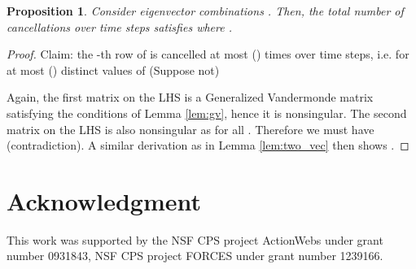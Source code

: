 \documentclass[journal]{IEEEtran}
\newtheorem{prop}{\bf{Proposition}}
\begin{document}
\begin{prop} \label{prop:m_vec}
Consider  eigenvector combinations . Then, the total number of cancellations over  time steps satisfies  where .
\end{prop}
\begin{proof}
Claim: the -th row of  is cancelled at most () times over  time steps, i.e. for at most () distinct values of 
(Suppose not)

Again, the first matrix on the LHS is a Generalized Vandermonde matrix satisfying the conditions of Lemma \ref{lem:gv}, hence it is nonsingular. The second matrix on the LHS is also nonsingular as  for all . Therefore we must have  (contradiction). A similar derivation as in Lemma \ref{lem:two_vec} then shows .
\end{proof}



























\section*{Acknowledgment}
This work was supported by the NSF CPS project ActionWebs under grant number 0931843, NSF CPS project FORCES under grant number
1239166.









\end{document}
